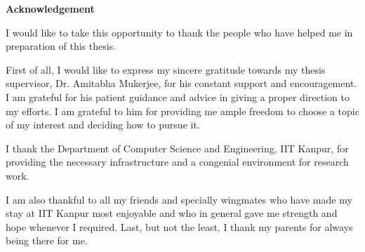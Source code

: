 \cleardoublepage

\begin{center}
	{\huge{\textbf{Acknowledgement}}}
\end{center}

I would like to take this opportunity to thank the people who have helped me in preparation of this thesis.

First of all, I would like to express my sincere gratitude towards my thesis supervisor, Dr. Amitabha Mukerjee, for his  constant support and encouragement. I am grateful for his patient guidance and advice in giving a proper direction to my efforts. I am grateful to him for providing me ample freedom to choose a topic of my interest and deciding how to pursue it.

I thank the Department of Computer Science and Engineering, IIT Kanpur, for providing the necessary infrastructure and a congenial environment for research work.

I am also thankful to all my friends and specially wingmates who have made my stay at IIT Kanpur most enjoyable and who in general gave me strength and hope whenever I required.
Last, but not the least, I thank my parents for always being there for me.

\vskip 4mm
\begin{flushright}
\textit{\textbf{\author}}
\end{flushright}
